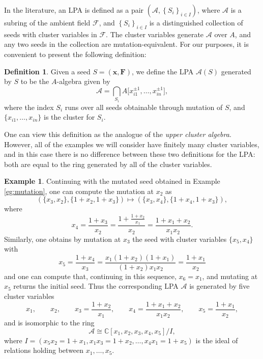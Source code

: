 \documentclass[pdftex]{sigma}
\numberwithin{equation}{section}
\theoremstyle{definition}
\newtheorem{defn}[thm]{Definition}
\newtheorem{eg}[thm]{Example}
\begin{document}
In the literature, an LPA is defined as a pair $\left(\mathcal{A}, \left\{S_i\right\}_{i\in I}\right)$, where $\mathcal A$ is a subring of the ambient field $\mathcal F$, and $\left\{ S_i \right\}_{i\in I}$ is a distinguished collection of seeds with cluster variables in $\mathcal F$. The cluster variables generate $\mathcal A$ over $A$, and any two seeds in the collection are mutation-equivalent. For our purposes, it is convenient to present the following definition:
\begin{defn}
	Given a seed $S = (\bm{x}, \bm{F})$, we define the LPA $\mathcal{A}(S)$ generated by $S$ to be the $A$-algebra given by
	\begin{equation*}
		\mathcal{A} = \bigcap_{S_i} A\big[x_{i1}^{\pm1}, \ldots, x_{in}^{\pm1}\big],
	\end{equation*}
	where the index $S_i$ runs over all seeds obtainable through mutation of $S$, and $\{x_{i1}, \dots , x_{in}\}$ is the cluster for $S_i$.
\end{defn}

One can view this definition as the analogue of the \emph{upper cluster algebra}. However, all of the examples we will consider have finitely many cluster variables, and in this case there is no difference between these two definitions for the LPA: both are equal to the ring generated by all of the cluster variables.

\begin{eg}
Continuing with the mutated seed obtained in Example \ref{eg:mutation}, one can compute the mutation at $x_2$ as
\[
 ( \{x_3, x_2\}, \{1 + x_2, 1 + x_3\} ) \mapsto ( \{x_3, x_4\}, \{1 + x_4, 1 + x_3\} ),
\]
where
\[
 x_4 = \frac{1 + x_3}{x_2} = \frac{1 + \frac{1 + x_2}{x_1}}{x_2} = \frac{1 + x_1 + x_2}{x_1x_2}.
\]
Similarly, one obtains by mutation at $x_3$ the seed with cluster variables $\{x_5, x_4\}$ with
\[
 x_5 = \frac{1 + x_4}{x_3} = \frac{x_1(1 + x_2)(1+x_1)}{(1+x_2)x_1x_2} = \frac{1 + x_1}{x_2}
\]
and one can compute that, continuing in this sequence, $x_6 = x_1$, and mutating at $x_5$ returns the initial seed. Thus the corresponding LPA $\mathcal A$ is generated by five cluster variables
\[
 x_1, \qquad x_2, \qquad x_3=\frac{1 + x_2}{x_1}, \qquad x_4=\frac{1 + x_1 + x_2}{x_1x_2}, \qquad x_5=\frac{1 + x_1}{x_2},
\]
and is isomorphic to the ring
\[ \mathcal A \cong \mathbb{C}[x_1,x_2,x_3,x_4,x_5]/I, \]
where $I=(x_5x_2=1+x_1, x_1x_3=1+x_2, \ldots, x_4x_1=1+x_5)$ is the ideal of relations holding between $x_1,\ldots,x_5$.
\end{eg}
\end{document}
